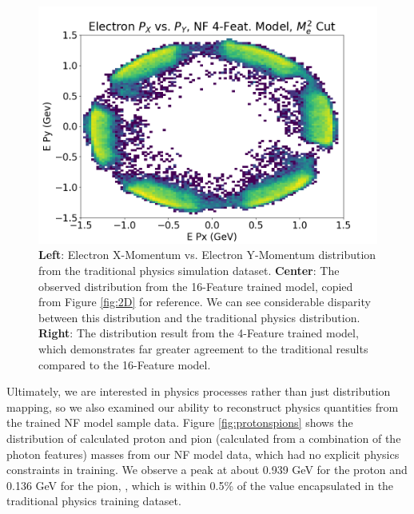 \begin{figure}[htb]
\begin{minipage}{0.1323\textwidth}
        \includegraphics[width=.99\textwidth,trim={0 0 0 0},clip]{Chapters/Ch3-Simulations/normalizing_flows/pics/FinalPictures/2D_Hists_4F/Electron_P_X_vs_P_Y,_NF_4-Feat_Model,_M_e2_Cut.png}
    \end{minipage}
    \caption[Placeholder Short text]{\textbf{Left}: Electron X-Momentum vs. Electron Y-Momentum distribution from the traditional physics simulation dataset. \textbf{Center}: The observed distribution from the 16-Feature trained model, copied from Figure \ref{fig:2D} for reference. We can see considerable disparity between this distribution and the traditional physics distribution. \textbf{Right}: The distribution result from the 4-Feature trained model, which demonstrates far greater agreement to the traditional results compared to the 16-Feature model. }
    \label{fig:2D4F}
\end{figure}


Ultimately, we are interested in physics processes rather than just distribution mapping, so we also examined our ability to reconstruct physics quantities from the trained NF model sample data. Figure \ref{fig:protonspions} shows the distribution of calculated proton and pion (calculated from a combination of the photon features) masses from our NF model data, which had no explicit physics constraints in training. We observe a peak at about 0.939 GeV for the proton and 0.136 GeV for the pion, , which is within 0.5\% of the value encapsulated in the traditional physics training dataset. 


\begin{figure}[htb]
    \centering
    

    \label{fig:protons}
\end{figure}



